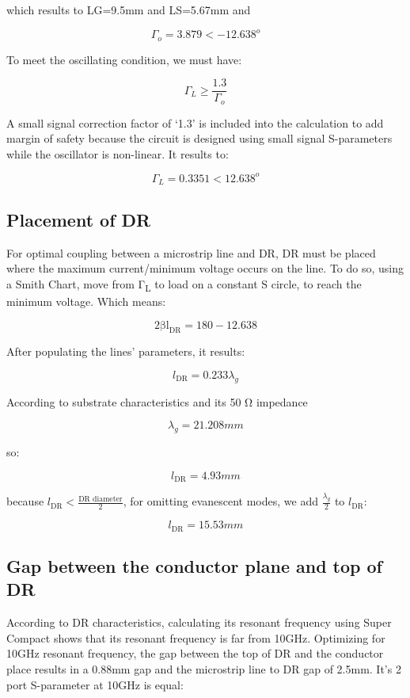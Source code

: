which results to LG=9.5mm and LS=5.67mm and

\[\Gamma_{o} = 3.879 < - 12.638^{o}\]

To meet the oscillating condition, we must have:

\[\Gamma_{L} \geq \frac{1.3}{\Gamma_{o}}\]

A small signal correction factor of `1.3' is included into the
calculation to add margin of safety because the circuit is designed
using small signal S-parameters while the oscillator is non-linear. It
results to:

\[\Gamma_{L} = 0.3351 < 12.638^{o}\]

\hypertarget{placement-of-dr}{%
\subsection{\texorpdfstring{ Placement of
DR}{ Placement of DR}}\label{placement-of-dr}}

For optimal coupling between a microstrip line and DR, DR must be placed
where the maximum current/minimum voltage occurs on the line. To do so,
using a Smith Chart, move from Γ\textsubscript{L} to load on a constant
S circle, to reach the minimum voltage. Which means:

\[2\text{βl}_{\text{DR}} = 180 - 12.638\]

After populating the lines' parameters, it results:

\[l_{\text{DR}} = 0.233\lambda_{g}\]

According to substrate characteristics and its 50 Ω impedance

\[\lambda_{g} = 21.208mm\]

so:

\[l_{\text{DR}} = 4.93mm\]

because \(l_{\text{DR}} < \frac{\text{DR\ diameter}}{2}\), for omitting
evanescent modes, we add \(\frac{\lambda_{g}}{2}\) to \(l_{\text{DR}}\):

\[l_{\text{DR}} = 15.53mm\]

\hypertarget{gap-between-the-conductor-plane-and-top-of-dr}{%
\subsection{\texorpdfstring{ Gap between the conductor plane and top of
DR}{ Gap between the conductor plane and top of DR}}\label{gap-between-the-conductor-plane-and-top-of-dr}}

According to DR characteristics, calculating its resonant frequency
using Super Compact shows that its resonant frequency is far from 10GHz.
Optimizing for 10GHz resonant frequency, the gap between the top of DR
and the conductor place results in a 0.88mm gap and the microstrip line
to DR gap of 2.5mm. It's 2 port S-parameter at 10GHz is equal:


